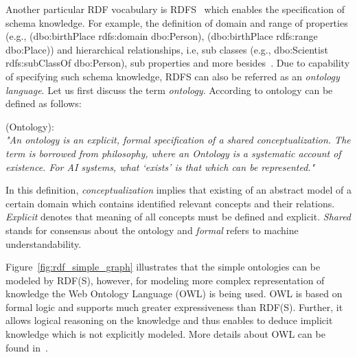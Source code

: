\par Another particular RDF vocabulary is RDFS~\cite{DBLP:books/crc/Hitzler2010} which enables the specification of schema knowledge. For example, the definition of domain and range of properties (e.g., (\textsf{dbo:birthPlace rdfs:domain dbo:Person}), (\textsf{dbo:birthPlace rdfs:range dbo:Place})) and hierarchical relationships, i.e, sub classes (e.g., \textsf{dbo:Scientist rdfs:subClassOf dbo:Person}), sub properties and more besides~\cite{DBLP:books/crc/Hitzler2010}. Due to capability of specifying such schema knowledge, RDFS can also be referred as an \textit{ontology language}. Let us first discuss the term \textit{ontology}. According to \cite{gruber1993translation} ontology can be defined as follows:
\begin{definition}{(Ontology):\\}
\textit{"An ontology is an explicit, formal specification of a shared conceptualization. The term is borrowed from philosophy, where an Ontology is a systematic account of existence. For AI systems, what ‘exists’ is that which can be represented."}
\end{definition}
In this definition, \textit{conceptualization} implies that existing of an abstract model of a certain domain which contains identified relevant concepts and their relations. \textit{Explicit} denotes that meaning of all concepts must be defined and explicit. \textit{Shared} stands for consensus about the ontology and \textit{formal} refers to machine understandability.  


Figure~\ref{fig:rdf_simple_graph} illustrates that the simple ontologies can be modeled by RDF(S), however, for modeling more complex representation of knowledge the Web Ontology Language (OWL) is being used. OWL is based on formal logic and supports much greater expressiveness than RDF(S). Further, it allows logical reasoning on the knowledge and thus enables to deduce implicit knowledge which is not explicitly modeled. More details about OWL can be found  in~\cite{DBLP:books/crc/Hitzler2010}.
